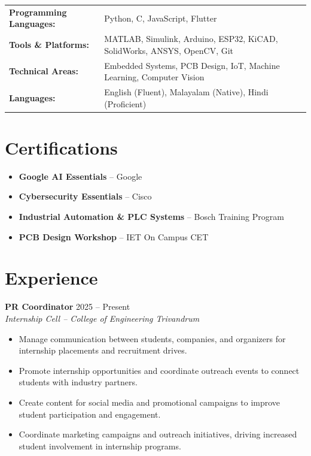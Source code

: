 \documentclass[a4paper,11pt]{article}
\begin{document}
\noindent
\begin{tabular}{@{}ll}
\textbf{Programming Languages:} & Python, C, JavaScript, Flutter \\[2pt]
\textbf{Tools \& Platforms:}    & MATLAB, Simulink, Arduino, ESP32, KiCAD, SolidWorks, ANSYS, OpenCV, Git \\[2pt]
\textbf{Technical Areas:}       & Embedded Systems, PCB Design, IoT, Machine Learning, Computer Vision \\[2pt]
\textbf{Languages:}             & English (Fluent), Malayalam (Native), Hindi (Proficient) \\
\end{tabular}

\section{Certifications}

\begin{itemize}
  \item \textbf{Google AI Essentials} -- Google
  \item \textbf{Cybersecurity Essentials} -- Cisco
  \item \textbf{Industrial Automation \& PLC Systems} -- Bosch Training Program
  \item \textbf{PCB Design Workshop} -- IET On Campus CET
\end{itemize}


\section{Experience}

\noindent
\textbf{PR Coordinator} \hfill 2025 -- Present\\
\textit{Internship Cell -- College of Engineering Trivandrum}
\begin{itemize}
  \item Manage communication between students, companies, and organizers for internship placements and recruitment drives.
  \item Promote internship opportunities and coordinate outreach events to connect students with industry partners.
  \item Create content for social media and promotional campaigns to improve student participation and engagement.
  \item Coordinate marketing campaigns and outreach initiatives, driving increased student involvement in internship programs.
\end{itemize}
\end{document}
